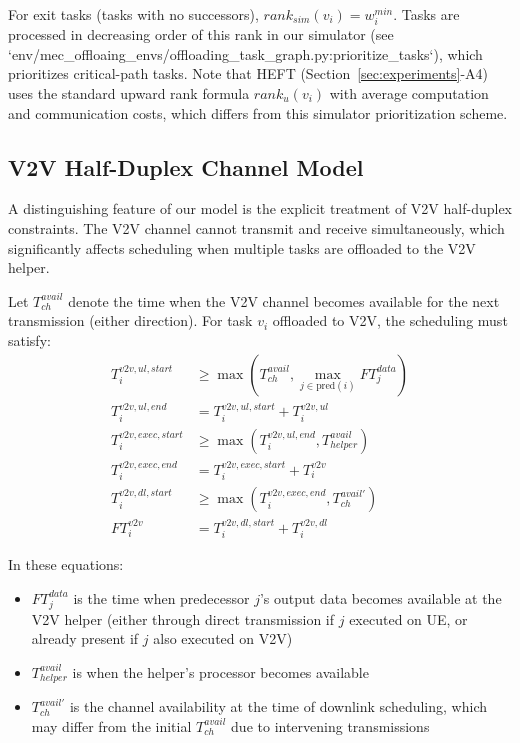 \documentclass[journal,twoside]{IEEEtran}
\begin{document}
For exit tasks (tasks with no successors), $rank_{sim}(v_i) = w_i^{min}$. Tasks are processed in decreasing order of this rank in our simulator (see `env/mec_offloaing_envs/offloading_task_graph.py:prioritize_tasks`), which prioritizes critical-path tasks. Note that HEFT (Section~\ref{sec:experiments}-A4) uses the standard upward rank formula $rank_u(v_i)$ with average computation and communication costs, which differs from this simulator prioritization scheme.

\subsection{V2V Half-Duplex Channel Model}

A distinguishing feature of our model is the explicit treatment of V2V half-duplex constraints. The V2V channel cannot transmit and receive simultaneously, which significantly affects scheduling when multiple tasks are offloaded to the V2V helper.

Let $T_{ch}^{avail}$ denote the time when the V2V channel becomes available for the next transmission (either direction). For task $v_i$ offloaded to V2V, the scheduling must satisfy:
    \begin{align}
T_i^{v2v,ul,start} &\geq \max\left( T_{ch}^{avail}, \max_{j \in \text{pred}(i)} FT_j^{data} \right) \label{eq:v2v_ul_start}\\
T_i^{v2v,ul,end} &= T_i^{v2v,ul,start} + T_i^{v2v,ul} \label{eq:v2v_ul_end}\\
T_i^{v2v,exec,start} &\geq \max\left( T_i^{v2v,ul,end}, T_{helper}^{avail} \right) \label{eq:v2v_exec_start}\\
T_i^{v2v,exec,end} &= T_i^{v2v,exec,start} + T_i^{v2v} \label{eq:v2v_exec_end}\\
T_i^{v2v,dl,start} &\geq \max\left( T_i^{v2v,exec,end}, T_{ch}^{avail'} \right) \label{eq:v2v_dl_start}\\
FT_i^{v2v} &= T_i^{v2v,dl,start} + T_i^{v2v,dl} \label{eq:v2v_ft}
    \end{align}

In these equations:
\begin{itemize}
    \item $FT_j^{data}$ is the time when predecessor $j$'s output data becomes available at the V2V helper (either through direct transmission if $j$ executed on UE, or already present if $j$ also executed on V2V)
    \item $T_{helper}^{avail}$ is when the helper's processor becomes available
    \item $T_{ch}^{avail'}$ is the channel availability at the time of downlink scheduling, which may differ from the initial $T_{ch}^{avail}$ due to intervening transmissions
\end{itemize}
\end{document}
